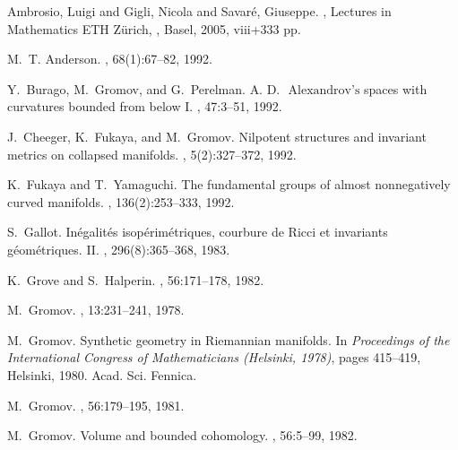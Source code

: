 \documentclass{amsart}
\begin{document}
\begin{thebibliography}{HMR75}

  {Ambrosio, Luigi and Gigli, Nicola and Savar{\'e}, Giuseppe}.
, \newblock
{Lectures in Mathematics ETH Z\"urich}, ,
 {Basel},
 {2005},
 {viii+333} pp.

M.~T. Anderson.
, 68(1):67--82, 1992.

Y.~Burago, M.~Gromov, and G.~Perelman.
\newblock $\text{A.~D. ~Alexandrov's}$ spaces with curvatures bounded from
  below \rm{I}.
, 47:3--51, 1992.

J.~Cheeger, K.~Fukaya, and M.~Gromov.
\newblock Nilpotent structures and invariant metrics on collapsed manifolds.
, 5(2):327--372, 1992.

K.~Fukaya and T.~Yamaguchi.
\newblock The fundamental groups of almost nonnegatively curved manifolds.
, 136(2):253--333, 1992.

S.~Gallot.
\newblock In\'egalit\'es isop\'erim\'etriques, courbure de {R}icci et
  invariants g\'eom\'etriques. {II}.
, 296(8):365--368, 1983.


K.~Grove and S.~Halperin.
, 56:171--178, 1982.




M.~Gromov.
, 13:231--241, 1978.

M.~Gromov.
\newblock Synthetic geometry in {R}iemannian manifolds.
\newblock In {\em Proceedings of the International Congress of Mathematicians
  (Helsinki, 1978)}, pages 415--419, Helsinki, 1980. Acad. Sci. Fennica.

M.~Gromov.
, 56:179--195, 1981.

M.~Gromov.
\newblock Volume and bounded cohomology.
, 56:5--99, 1982.



\end{thebibliography}
\end{document}
